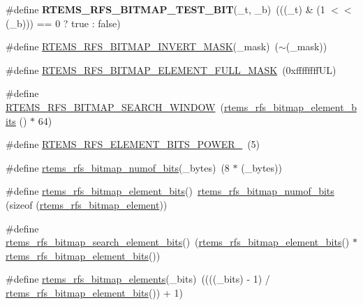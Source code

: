 \begin{DoxyCompactItemize}
\#define {\bfseries R\+T\+E\+M\+S\+\_\+\+R\+F\+S\+\_\+\+B\+I\+T\+M\+A\+P\+\_\+\+T\+E\+S\+T\+\_\+\+B\+IT}(\+\_\+t,  \+\_\+b)~(((\+\_\+t) \& (1 $<$$<$ (\+\_\+b))) == 0 ? true \+: false)
\item 
\#define \mbox{\hyperlink{rtems-rfs-bitmaps_8h_af0872737babfc79ed19f089f387471cb}{R\+T\+E\+M\+S\+\_\+\+R\+F\+S\+\_\+\+B\+I\+T\+M\+A\+P\+\_\+\+I\+N\+V\+E\+R\+T\+\_\+\+M\+A\+SK}}(\+\_\+mask)~($\sim$(\+\_\+mask))
\item 
\#define \mbox{\hyperlink{rtems-rfs-bitmaps_8h_a4bf35eb00bf85c48828951345f140106}{R\+T\+E\+M\+S\+\_\+\+R\+F\+S\+\_\+\+B\+I\+T\+M\+A\+P\+\_\+\+E\+L\+E\+M\+E\+N\+T\+\_\+\+F\+U\+L\+L\+\_\+\+M\+A\+SK}}~(0xffffffff\+U\+L)
\item 
\#define \mbox{\hyperlink{rtems-rfs-bitmaps_8h_ad3c7e12ac41b9056a1109cf017258407}{R\+T\+E\+M\+S\+\_\+\+R\+F\+S\+\_\+\+B\+I\+T\+M\+A\+P\+\_\+\+S\+E\+A\+R\+C\+H\+\_\+\+W\+I\+N\+D\+OW}}~(\mbox{\hyperlink{rtems-rfs-bitmaps_8h_a1a65e04003510b29a2fcb55e43940449}{rtems\+\_\+rfs\+\_\+bitmap\+\_\+element\+\_\+bits}} () $\ast$ 64)
\item 
\#define \mbox{\hyperlink{rtems-rfs-bitmaps_8h_a50825eb249f04b99969055b75f2da875}{R\+T\+E\+M\+S\+\_\+\+R\+F\+S\+\_\+\+E\+L\+E\+M\+E\+N\+T\+\_\+\+B\+I\+T\+S\+\_\+\+P\+O\+W\+E\+R\+\_}}~(5)
\item 
\#define \mbox{\hyperlink{rtems-rfs-bitmaps_8h_a789a8cd5be87a1954942fc26a9e928c0}{rtems\+\_\+rfs\+\_\+bitmap\+\_\+numof\+\_\+bits}}(\+\_\+bytes)~(8 $\ast$ (\+\_\+bytes))
\item 
\#define \mbox{\hyperlink{rtems-rfs-bitmaps_8h_a1a65e04003510b29a2fcb55e43940449}{rtems\+\_\+rfs\+\_\+bitmap\+\_\+element\+\_\+bits}}()~\mbox{\hyperlink{rtems-rfs-bitmaps_8h_a789a8cd5be87a1954942fc26a9e928c0}{rtems\+\_\+rfs\+\_\+bitmap\+\_\+numof\+\_\+bits}} (sizeof (\mbox{\hyperlink{rtems-rfs-bitmaps_8h_a2e909e0a0c9759ac71ca69851253b905}{rtems\+\_\+rfs\+\_\+bitmap\+\_\+element}}))
\item 
\#define \mbox{\hyperlink{rtems-rfs-bitmaps_8h_a5b8b4c46da0f907b713cf14639b85835}{rtems\+\_\+rfs\+\_\+bitmap\+\_\+search\+\_\+element\+\_\+bits}}()~(\mbox{\hyperlink{rtems-rfs-bitmaps_8h_a1a65e04003510b29a2fcb55e43940449}{rtems\+\_\+rfs\+\_\+bitmap\+\_\+element\+\_\+bits}}() $\ast$ \mbox{\hyperlink{rtems-rfs-bitmaps_8h_a1a65e04003510b29a2fcb55e43940449}{rtems\+\_\+rfs\+\_\+bitmap\+\_\+element\+\_\+bits}}())
\item 
\#define \mbox{\hyperlink{rtems-rfs-bitmaps_8h_aa6013059cd24b7dbfca056121f4c51b3}{rtems\+\_\+rfs\+\_\+bitmap\+\_\+elements}}(\+\_\+bits)~((((\+\_\+bits) -\/ 1) / \mbox{\hyperlink{rtems-rfs-bitmaps_8h_a1a65e04003510b29a2fcb55e43940449}{rtems\+\_\+rfs\+\_\+bitmap\+\_\+element\+\_\+bits}}()) + 1)
$$
\end{DoxyCompactItemize}
